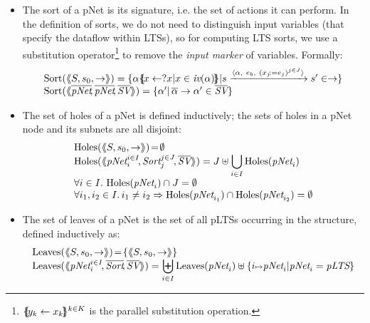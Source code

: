 \documentclass{llncs}
\begin{document}
\begin{definition}
  \begin{itemize}
  \item The sort of a pNet is its signature, i.e. the set of actions it can
perform. In the definition of sorts, we do not need to distinguish
input variables (that specify the dataflow within LTSs), so for
computing LTS sorts, we use a substitution operator\footnote{$\{\hspace{-0.88ex}\{\!y_k\gets x_k\!\}\hspace{-0.87ex}\}^{k\in 
K}$ is the parallel substitution 
operation.} to remove the
\emph{input marker} of variables. Formally:
\[
\begin{array}{l}
\Sortop(\mylangle S,s_0, \to\myrangle) = \{\alpha\subst{x \gets ?x| 
x\in\symb{iv}(\alpha)}|s \xrightarrow{\langle \alpha,~e_b,~(x_j\!:= {e}_j)^{j\in
    J}\rangle} s'\in \to \} \\
\Sortop(\mylangle \overline{\pNet}\!, %
\overline{\pNet}\!,
\overline{\symb{SV}}\myrangle)
=\{\alpha' |\, \overline{\alpha}%
\to\alpha'\in\set{\symb{SV}}\}
\end{array}
\]

\item
The set of holes of a pNet is defined inductively; the sets of holes
in a pNet node and its subnets are all disjoint:
  \[\begin{array}{l}
\Holes(\mylangle S,s_0, \to\myrangle) \!=\! \emptyset \\
\Holes(\mylangle \pNet_i^{i\in I}\!,\Sort_j^{j\in J}\!, \overline{\symb{SV}}\myrangle) 
=J\uplus{\displaystyle \bigcup_{i\in 
I}\Holes(\pNet_i)}\\
\forall i\in I.\, \Holes(\pNet_i)\cap J=\emptyset\\
\forall i_1,i_2\in I.\,i_1\neq i_2\Rightarrow  
\Holes(\pNet_{i_1})\cap\Holes(\pNet_{i_2})=\emptyset
\end{array}\]
\item
The set of leaves of a pNet is the set of all pLTSs occurring in the structure, defined 
inductively as:
\[\begin{array}{l}
\Leaves(\mylangle S,s_0, \to\myrangle) \!=\!\{\mylangle S,s_0, \to\myrangle\}\\
\Leaves(\mylangle \pNet_i^{i\in I}\!,%
\overline{\Sort}\!, \overline{\symb{SV}}\myrangle) = {\displaystyle \biguplus_{i\in 
I}\Leaves(\pNet_i)\uplus\{i\mapsto \pNet_i|\pNet_i=\pLTS\}}
\end{array}\]
\end{itemize}
\end{definition}
\end{document}

